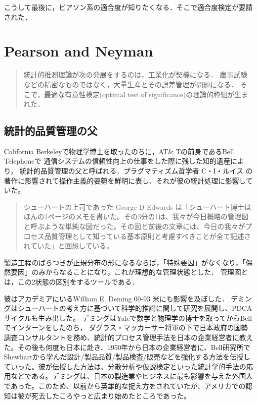 \documentclass[uplatex,dvipdfmx]{jsreport}
\begin{document}
こうして最後に，ピアソン系の適合度が知りたくなる．そこで適合度検定が要請された．

\chapter{Pearson and Neyman}

\begin{quotation}
    統計的推測理論が次の発展をするのは，工業化が契機になる．
    農事試験などの精密なものではなく，大量生産とその誤差管理が問題になる．
    そこで，最適な有意性検定(optimal test of significance)の理論的枠組が生まれた．
\end{quotation}

\section{統計的品質管理の父}

\begin{history}
    California Berkeleyで物理学博士を取ったのちに，AT\& Tの前身であるBell Telephoneで
    通信システムの信頼性向上の仕事をした際に残した知的遺産により，
    統計的品質管理の父と呼ばれる．プラグマティズム哲学者 C・I・ルイス の著作に影響されて操作主義的姿勢を鮮明に表し、それが彼の統計処理に影響していた。
    \begin{quote}
        シューハートの上司であった George D Edwards は「シューハート博士はほんの1ページのメモを書いた。その3分の1は、我々が今日概略の管理図と呼ぶような単純な図だった。その図と前後の文章には、今日の我々がプロセス品質管理として知っている基本原則と考慮すべきことが全て記述されていた」と回想している。
    \end{quote}
    製造工程のばらつきが正規分布の形になるならば，「特殊要因」がなくなり，「偶然要因」のみからなることになり，これが理想的な管理状態とした．
    管理図とは，この2状態の区別をするツールである．

    彼はアカデミアにいるWilliam E. Deming 00-93 米にも影響を及ぼした．
    デミングはシューハートの考え方に基づいて科学的推論に関して研究を展開し、PDCAサイクルも生み出した。 
    デミングはYaleで数学と物理学の博士を取ってからBellでインターンをしたのち，
    ダグラス・マッカーサー将軍の下で日本政府の国勢調査コンサルタントを務め、統計的プロセス管理手法を日本の企業経営者に教えた。その後も何度も日本に赴き、1950年から日本の企業経営者に、Bell研究所で
    Shewhartから学んだ設計/製品品質/製品検査/販売などを強化する方法を伝授していった。彼が伝授した方法は、分散分析や仮説検定といった統計学的手法の応用などである。デミングは、日本の製造業やビジネスに最も影響を与えた外国人であった。このため、以前から英雄的な捉え方をされていたが、アメリカでの認知は彼が死去したころやっと広まり始めたところであった。
\end{history}
\end{document}
